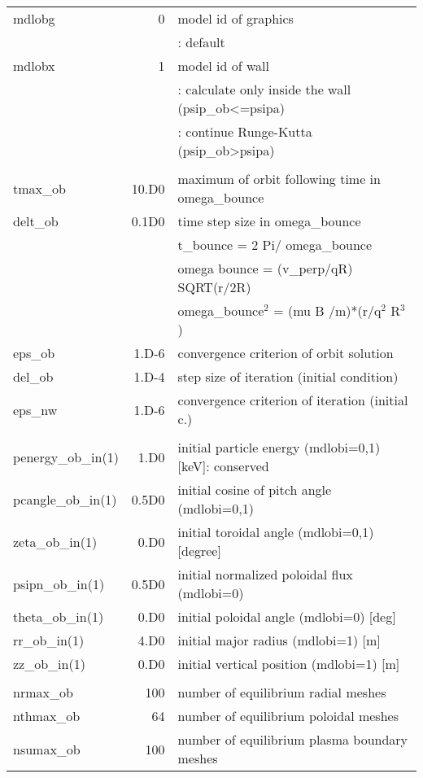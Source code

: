 \documentclass[11pt]{article}
\begin{document}
\begin{center}
\begin{tabular}{lrl}
    mdlobg   &     0 & model id of graphics \\
                    && \quad 0: default \\
    mdlobx   &     1 & model id of wall \\
                    && \quad 0: calculate only inside the wall
                                (psip\_ob<=psipa) \\
                    && \quad 1: continue Runge-Kutta
                                (psip\_ob>psipa) \\
    \\
    tmax\_ob  & 10.D0 & maximum of orbit following time in omega\_bounce \\
    delt\_ob  & 0.1D0 & time step size in omega\_bounce \\
                    && \quad t\_bounce = 2 Pi/ omega\_bounce \\
                    && \quad omega bounce = (v\_perp/qR) SQRT(r/2R) \\
                    && \quad omega\_bounce$^2$ = (mu B /m)*(r/q$^2$ R$^3$) \\
    eps\_ob   & 1.D-6 & convergence criterion of orbit solution \\
    del\_ob   & 1.D-4 & step size of iteration (initial condition) \\
    eps\_nw   & 1.D-6 & convergence criterion of iteration (initial c.) \\
    \\
    penergy\_ob\_in(1) & 1.D0  & initial particle energy (mdlobi=0,1)
    [keV]: conserved \\
    pcangle\_ob\_in(1) & 0.5D0 & initial cosine of pitch angle
    (mdlobi=0,1) \\
    zeta\_ob\_in(1)    & 0.D0  & initial toroidal angle (mdlobi=0,1)
    [degree] \\
    psipn\_ob\_in(1)   & 0.5D0 & initial normalized poloidal flux
    (mdlobi=0) \\
    theta\_ob\_in(1)   & 0.D0  & initial poloidal angle (mdlobi=0) [deg] \\
    rr\_ob\_in(1)      & 4.D0  & initial major radius (mdlobi=1) [m] \\
    zz\_ob\_in(1)      & 0.D0  & initial vertical position (mdlobi=1)
    [m] \\
    \\
    nrmax\_ob   & 100  & number of equilibrium radial meshes \\
    nthmax\_ob  &  64  & number of equilibrium poloidal meshes \\
    nsumax\_ob  & 100  & number of equilibrium plasma boundary meshes
  \end{tabular}
\end{center}
\end{document}
